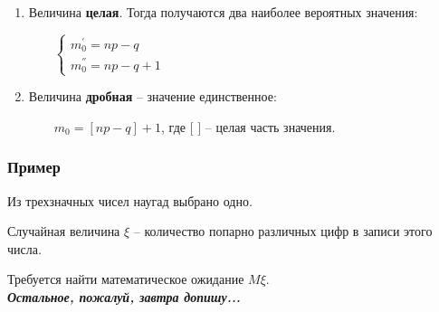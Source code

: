 \documentclass{article}
\begin{document}
\begin{enumerate}
\begin{enumerate}
\item Величина \textbf{целая}. Тогда получаются два наиболее вероятных значения:

$\qquad \begin{cases}
m_0^{'} = np - q\\
m_0^{''} = np - q + 1
\end{cases}$

\item Величина \textbf{дробная} -- значение единственное:

$\qquad m_0 = [np - q] + 1$, где $[$ $]$ -- целая часть значения.

\end{enumerate}
\end{enumerate}

\subsubsection{Пример}

Из трехзначных чисел наугад выбрано одно. 

Случайная величина $\xi$ -- количество попарно различных цифр в записи этого числа.

Требуется найти математическое ожидание $M\xi$.
\\

\textbf{\textit{Остальное, пожалуй, завтра допишу...}}
\end{document}
